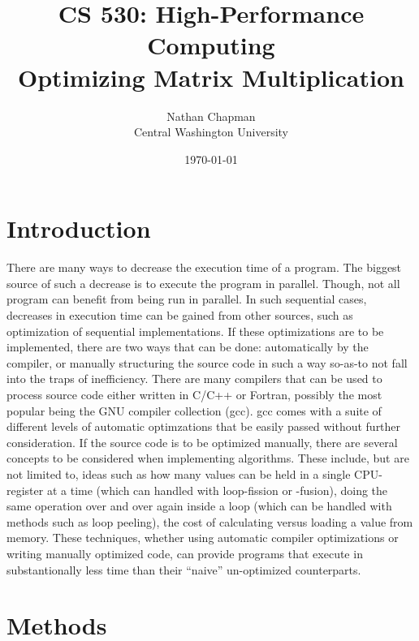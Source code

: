\documentclass{article}
\title{\Large \vspace{-0.625in} CS 530: High-Performance Computing \\ Optimizing Matrix Multiplication \vspace{-0.35in}}
\author{Nathan Chapman \vspace{-0.15in} \\ {\normalsize Central Washington University}}
\date{\normalsize \vspace{-0.15in}\today}
\begin{document}
\maketitle

    

\tableofcontents


\section{Introduction}

    There are many ways to decrease the execution time of a program.  The biggest source of such a decrease is to execute the program in parallel.  Though, not all program can benefit from being run in parallel.  In such sequential cases, decreases in execution time can be gained from other sources, such as optimization of sequential implementations.  If these optimizations are to be implemented, there are two ways that can be done: automatically by the compiler, or manually structuring the source code in such a way so-as-to not fall into the traps of inefficiency.  There are many compilers that can be used to process source code either written in C/C++ or Fortran, possibly the most popular being the GNU compiler collection (gcc).  gcc comes with a suite of different levels of automatic optimzations that be easily passed without further consideration.  If the source code is to be optimized manually, there are several concepts to be considered when implementing algorithms.  These include, but are not limited to, ideas such as how many values can be held in a single CPU-register at a time (which can handled with loop-fission or -fusion), doing the same operation over and over again inside a loop (which can be handled with methods such as loop peeling), the cost of calculating versus loading a value from memory.  These techniques, whether using automatic compiler optimizations or writing manually optimized code, can provide programs that execute in substantionally less time than their ``naive'' un-optimized counterparts.

\pagebreak

\section{Methods}
\end{document}
